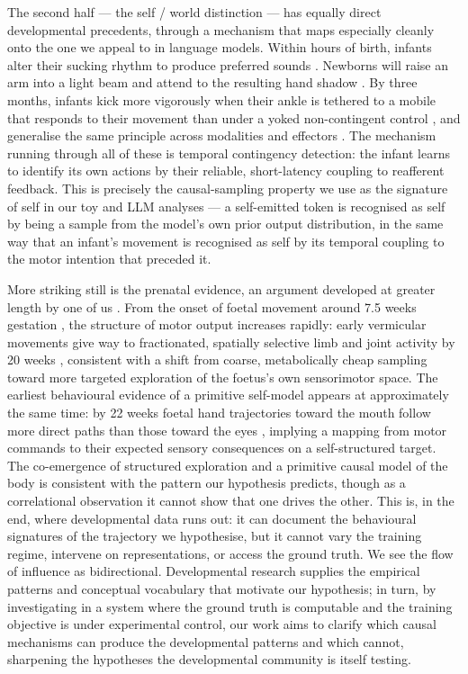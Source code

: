 \documentclass[11pt]{article}
\begin{document}
The second half --- the self / world distinction --- has equally direct developmental precedents, through a mechanism that maps especially cleanly onto the one we appeal to in language models. Within hours of birth, infants alter their sucking rhythm to produce preferred sounds \citep{decasper2009lateralized}. Newborns will raise an arm into a light beam and attend to the resulting hand shadow \citep{vandermeer1997limelight}. By three months, infants kick more vigorously when their ankle is tethered to a mobile that responds to their movement than under a yoked non-contingent control \citep{rovee1969conjugate}, and generalise the same principle across modalities and effectors \citep{lee2013contingent}. The mechanism running through all of these is temporal contingency detection: the infant learns to identify its own actions by their reliable, short-latency coupling to reafferent feedback. This is precisely the causal-sampling property we use as the signature of self in our toy and LLM analyses --- a self-emitted token is recognised as self by being a sample from the model's own prior output distribution, in the same way that an infant's movement is recognised as self by its temporal coupling to the motor intention that preceded it.

More striking still is the prenatal evidence, an argument developed at greater length by one of us \citep{rutar2024prenatal}. From the onset of foetal movement around 7.5 weeks gestation \citep{prechtl1985ultrasound}, the structure of motor output increases rapidly: early vermicular movements give way to fractionated, spatially selective limb and joint activity by 20 weeks \citep{devries1982emergence,piontelli2010conclusions,tiriac2014selfgenerated,lindemann2016spindle}, consistent with a shift from coarse, metabolically cheap sampling toward more targeted exploration of the foetus's own sensorimotor space. The earliest behavioural evidence of a primitive self-model appears at approximately the same time: by 22 weeks foetal hand trajectories toward the mouth follow more direct paths than those toward the eyes \citep{zoia2007evidence}, implying a mapping from motor commands to their expected sensory consequences on a self-structured target. The co-emergence of structured exploration and a primitive causal model of the body is consistent with the pattern our hypothesis predicts, though as a correlational observation it cannot show that one drives the other. This is, in the end, where developmental data runs out: it can document the behavioural signatures of the trajectory we hypothesise, but it cannot vary the training regime, intervene on representations, or access the ground truth. We see the flow of influence as bidirectional. Developmental research supplies the empirical patterns and conceptual vocabulary that motivate our hypothesis; in turn, by investigating in a system where the ground truth is computable and the training objective is under experimental control, our work aims to clarify which causal mechanisms can produce the developmental patterns and which cannot, sharpening the hypotheses the developmental community is itself testing.
\end{document}
